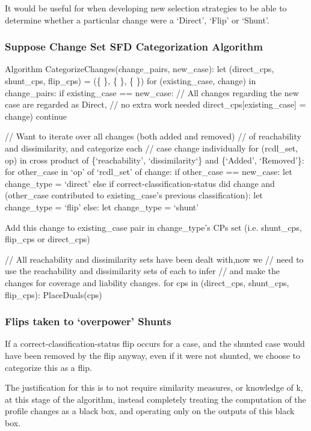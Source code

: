 \documentclass[a4paper,11pt]{report}
\begin{document}
It would be useful for when developing new selection strategies to be able to determine whether a particular change were a `Direct', `Flip' or `Shunt'.

\subsubsection{Suppose Change Set SFD Categorization Algorithm}
\begin{code}
Algorithm CategorizeChanges(change_pairs, new_case):
  let (direct_cps, shunt_cps, flip_cps) = (\{ \}, \{ \}, \{ \})
  for (existing_case, change) in change_pairs:
    if existing_case == new_case:
      // All changes regarding the new case are regarded as Direct, 
      // no extra work needed
      direct_cps[existing_case] = change)
      continue

    // Want to iterate over all changes (both added and removed) 
    // of reachability and dissimilarity, and categorize each 
    // case change individually
    for (rcdl_set, op) in cross product of 
                          \{`reachability', `dissimilarity`\} 
                      and \{`Added', `Removed'\}:
      for other_case in `op' of `rcdl_set' of change:
        if other_case == new_case:
          let change_type = `direct'
        else if correct-classification-status did change 
             and (other_case contributed to existing_case's
                      previous classification):
          let change_type = `flip'
        else:
          let change_type = `shunt'
          
        Add this change to existing_case pair in change_type's CPs set 
            (i.e. shunt_cps, flip_cps or direct_cps)
    
  // All reachability and dissimilarity sets have been dealt with,now we
  // need to use the reachability and dissimilarity sets of each to infer
  // and make the changes for coverage and liability changes.
  for cps in (direct_cps, shunt_cps, flip_cps):
    PlaceDuals(cps)
\end{code}

\subsubsection{Flips taken to `overpower' Shunts}
If a correct-classification-status flip occurs for a case, and the shunted case would have been removed by the flip anyway, even if it were not shunted, we choose to categorize this as a flip. 

The justification for this is to not require similarity measures, or knowledge of k, at this stage of the algorithm, instead completely treating the computation of the profile changes as a black box, and operating only on the outputs of this black box.
\end{document}
